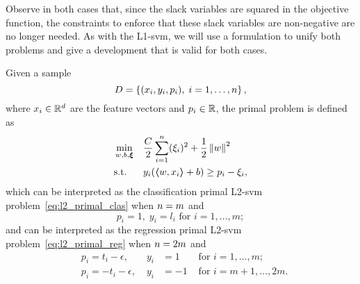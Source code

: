 %
Observe in both cases that, since the slack variables are squared in the objective function, the constraints to enforce that these slack variables are non-negative are no longer needed.
As with the L1-\acrshort{svm}, we will use a formulation to unify both problems and give a development that is valid for both cases. 
%
%
\begin{definition}
    Given a sample
    $$ D = \left\{(x_i, y_i, p_i), \; i=1, \ldots, n\right\} ,$$
    where $x_i \in \mathbb{R}^d$ are the feature vectors and $p_i \in \mathbb{R}$, 
    the primal problem is defined as
    \begin{equation}
        \label{eq:l2_primal}
        \begin{aligned}
            &\min_{w, b, \fv{\xi}} & & \frac{C}{2} \sum_{i=1}^\nsamples (\xi_i)^2 + \frac{1}{2} \norm{w}^2 \\
            & \text{s.t.} & & y_i (\dotp{w}{x_i} + b) \geq p_i - \xi_i ,     
        \end{aligned}  
    \end{equation}
    which can be interpreted as the classification primal L2-\acrshort{svm} problem~\eqref{eq:l2_primal_clas} when $n=m$ and
    $$ p_i = 1,\; y_i = l_i \text{ for } i=1, \ldots, m ;$$
    and can be interpreted as the regression primal L2-\acrshort{svm} problem~\eqref{eq:l2_primal_reg} when $n = 2 m$ and
    \begin{equation}
        \nonumber
        \begin{aligned}
            & p_i = t_i - \epsilon ,\; &y_i &= 1 &\text{ for } i=1, \ldots, m ; \\
            & p_i = -t_i - \epsilon ,\; &y_i &= -1 &\text{ for } i=m+1, \ldots, 2m .
        \end{aligned}
    \end{equation}
\end{definition}
%
